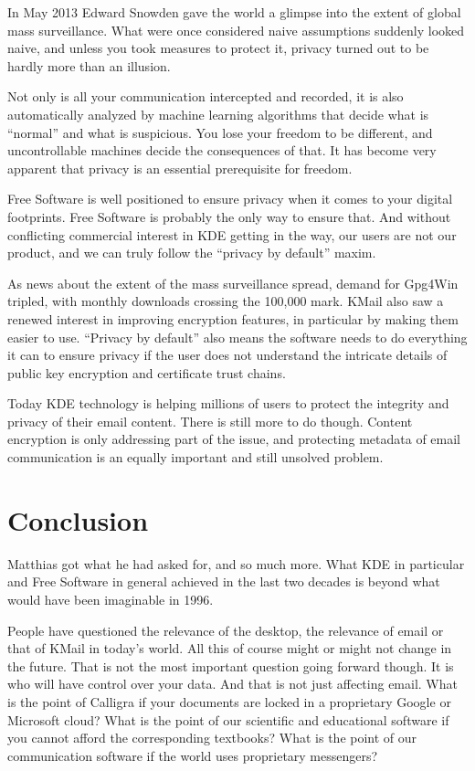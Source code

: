 In May 2013 Edward Snowden gave the world a glimpse into the extent of global mass surveillance. What were once considered naive assumptions suddenly looked naive, and unless you took measures to protect it, privacy turned out to be hardly more than an illusion.

Not only is all your communication intercepted and recorded, it is also automatically analyzed by machine learning algorithms that decide what is “normal” and what is suspicious. You lose your freedom to be different, and uncontrollable machines decide the consequences of that. It has become very apparent that privacy is an essential prerequisite for freedom.

Free Software is well positioned to ensure privacy when it comes to your digital footprints. Free Software is probably the only way to ensure that. And without conflicting commercial interest in KDE getting in the way, our users are not our product, and we can truly follow the “privacy by default” maxim.

As news about the extent of the mass surveillance spread, demand for Gpg4Win tripled, with monthly downloads crossing the 100,000 mark. KMail also saw a renewed interest in improving encryption features, in particular by making them easier to use. “Privacy by default” also means the software needs to do everything it can to ensure privacy if the user does not understand the intricate details of public key encryption and certificate trust chains.

Today KDE technology is helping millions of users to protect the integrity and privacy of their email content. There is still more to do though. Content encryption is only addressing part of the issue, and protecting metadata of email communication is an equally important and still unsolved problem.

\section*{Conclusion}

Matthias got what he had asked for, and so much more. What KDE in particular and Free Software in general achieved in the last two decades is beyond what would have been imaginable in 1996.

People have questioned the relevance of the desktop, the relevance of email or that of KMail in today's world. All this of course might or might not change in the future. That is not the most important question going forward though. It is who will have control over your data. And that is not just affecting email. What is the point of Calligra if your documents are locked in a proprietary Google or Microsoft cloud? What is the point of our scientific and educational software if you cannot afford the corresponding textbooks? What is the point of our communication software if the world uses proprietary messengers?

